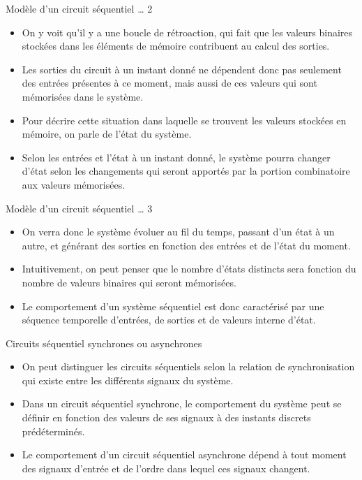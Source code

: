 \documentclass[presentation]{beamer}
\begin{document}
\begin{frame}[label={sec:orgaed08f2}]{Modèle d'un circuit séquentiel \ldots{} 2}
\begin{itemize}
\item On y voit qu'il y a une boucle de rétroaction, qui fait que les valeurs binaires stockées dans les éléments de mémoire contribuent au calcul des sorties.

\item Les sorties du circuit à un instant donné ne dépendent donc pas seulement des entrées présentes à ce moment, mais aussi de ces valeurs qui sont mémorisées dans le système.

\item Pour décrire cette situation dans laquelle se trouvent les valeurs stockées en mémoire, on parle de l'\alert{état} du système.

\item Selon les entrées et l'état à un instant donné, le système pourra changer d'état selon les changements qui seront apportés par la portion combinatoire aux valeurs mémorisées.
\end{itemize}
\end{frame}

\begin{frame}[label={sec:orge49b2af}]{Modèle d'un circuit séquentiel \ldots{} 3}
\begin{itemize}
\item On verra donc le système évoluer au fil du temps, passant d'un état à un autre, et générant des sorties en fonction des entrées et de l'état du moment.

\item Intuitivement, on peut penser que le nombre d'états distincts sera fonction du nombre de valeurs binaires qui seront mémorisées.

\item Le comportement d'un système séquentiel est donc caractérisé par une séquence temporelle d'entrées, de sorties et de valeurs interne d'état.
\end{itemize}
\end{frame}

\begin{frame}[label={sec:org135c244}]{Circuits séquentiel synchrones ou asynchrones}
\begin{itemize}
\item On peut distinguer les circuits séquentiels selon la relation de synchronisation qui existe entre les différents signaux du système.

\item Dans un circuit séquentiel \alert{synchrone}, le comportement du système peut se définir en fonction des valeurs de ses signaux à des instants discrets prédéterminés.

\item Le comportement d'un circuit séquentiel \alert{asynchrone} dépend à tout moment des signaux d'entrée et de l'ordre dans lequel ces signaux changent.
\end{itemize}
\end{frame}
\end{document}
